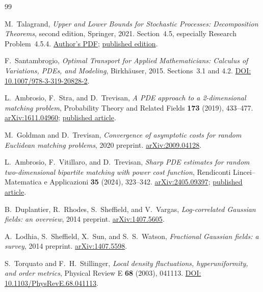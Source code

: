 \documentclass[11pt]{article}
\theoremstyle{definition}
\begin{document}
\begin{thebibliography}{99}

M.~Talagrand,
\emph{Upper and Lower Bounds for Stochastic Processes: Decomposition
Theorems}, second edition, Springer, 2021.
Section~4.5, especially Research Problem~4.5.4.
\href{https://michel.talagrand.net/ULBSPRINGER.pdf}{Author's PDF};
\href{https://doi.org/10.1007/978-3-030-82595-9}{published edition}.

F.~Santambrogio,
\emph{Optimal Transport for Applied Mathematicians: Calculus of
Variations, PDEs, and Modeling}, Birkh\"auser, 2015.
Sections~3.1 and 4.2.
\href{https://doi.org/10.1007/978-3-319-20828-2}{DOI: 10.1007/978-3-319-20828-2}.

L.~Ambrosio, F.~Stra, and D.~Trevisan,
\emph{A PDE approach to a 2-dimensional matching problem},
Probability Theory and Related Fields \textbf{173} (2019), 433--477.
\href{https://arxiv.org/abs/1611.04960}{arXiv:1611.04960};
\href{https://doi.org/10.1007/s00440-018-0837-x}{published article}.

M.~Goldman and D.~Trevisan,
\emph{Convergence of asymptotic costs for random Euclidean matching
problems}, 2020 preprint.
\href{https://arxiv.org/abs/2009.04128}{arXiv:2009.04128}.

L.~Ambrosio, F.~Vitillaro, and D.~Trevisan,
\emph{Sharp PDE estimates for random two-dimensional bipartite matching
with power cost function}, Rendiconti Lincei--Matematica e Applicazioni
\textbf{35} (2024), 323--342.
\href{https://arxiv.org/abs/2405.09397}{arXiv:2405.09397};
\href{https://doi.org/10.4171/RLM/1042}{published article}.

B.~Duplantier, R.~Rhodes, S.~Sheffield, and V.~Vargas,
\emph{Log-correlated Gaussian fields: an overview}, 2014 preprint.
\href{https://arxiv.org/abs/1407.5605}{arXiv:1407.5605}.

A.~Lodhia, S.~Sheffield, X.~Sun, and S.~S.~Watson,
\emph{Fractional Gaussian fields: a survey}, 2014 preprint.
\href{https://arxiv.org/abs/1407.5598}{arXiv:1407.5598}.

S.~Torquato and F.~H.~Stillinger,
\emph{Local density fluctuations, hyperuniformity, and order metrics},
Physical Review E \textbf{68} (2003), 041113.
\href{https://doi.org/10.1103/PhysRevE.68.041113}{DOI: 10.1103/PhysRevE.68.041113}.

\end{thebibliography}
\end{document}
